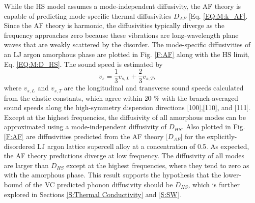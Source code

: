 \documentclass[aps,prb,onecolumn,preprint,footinbib,superscriptaddress,amsmath,amssymb,floatfix]{revtex4}
\begin{document}
While the HS model assumes a mode-independent diffusivity, 
the AF theory is capable of predicting mode-specific thermal 
diffusivities $D_{AF}$ [Eq. \eqref{EQ:M:k_AF}.
\cite{feldman_thermal_1993,feldman_numerical_1999,
shenogin_predicting_2009} Since the AF theory is harmonic, the 
diffusivities typically diverge as the frequency approaches zero 
because these vibrations are long-wavelength plane waves  
that are weakly scattered by the disorder.
\cite{sheng_introduction_2006,vitelli_heat_2010}
The mode-specific diffusivities of an LJ argon amorphous 
phase\cite{vc_fn4_2013} are plotted in Fig. \ref{F:AF} along with the HS 
limit, Eq. \eqref{EQ:M:D_HS}. The sound speed is estimated by 
\begin{equation}\label{EQ:M:vs}
v_s = \frac{1}{3}v_{s,L} + \frac{2}{3}v_{s,T},
\end{equation}
where $v_{s,L}$ and $v_{s,T}$ are the longitudinal and transverse 
sound speeds calculated from the elastic constants,
\cite{gale_general_2003} which agree within 20 $\%$ with the 
branch-averaged sound speeds along the high-symmetry dispersion 
directions [100],[110], and [111]. 
Except at the highest frequencies, the diffusivity of all amorphous 
modes can be approximated using a mode-independent diffusivity of $D_{HS}$. 
Also plotted in Fig. \ref{F:AF} are 
diffusivities predicted from the AF theory [$D_{AF}$] for the 
explicitly-disordered LJ argon lattice supercell  
alloy at a concentration of 0.5. As expected, the AF theory 
predictions diverge at low frequency.\cite{vc_fn5_2013} 
The diffusivity of all modes are larger than $D_{HS}$ except 
at the highest frequencies, where they tend to zero as with the amorphous 
phase. This result supports the hypothesis that the lower-bound of the 
VC predicted phonon diffusivity should be $D_{HS}$, which 
is further explored in Sections \ref{S:Thermal Conductivity} and 
\ref{S:SW}.


\end{document}
